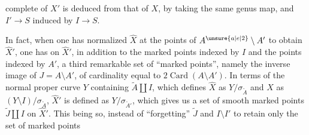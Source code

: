 complete of $X'$ is deduced from that of $X$, by taking the same genus map, and $I'\longrightarrow S$ induced by $I\longrightarrow S$.

In fact, when one has normalized $\widehat X$ at the points of $A^{\unsure{a|e|2}}\setminus A'$ to obtain $\widehat X'$, one has on $\widehat X'$, in addition to the marked points indexed by $I$ and the  points indexed by $A'$, a third remarkable set of ``marked points'', namely the inverse image  of $J=A\setminus A'$,  of cardinality equal to $2\operatorname{Card}(A\setminus A')$. In terms of the normal proper curve $Y$  containing $\widetilde A\amalg I$, which defines $\widehat X$ as $Y/\sigma_{\widetilde A}$ and $X$ as $(Y\setminus I)/\sigma_{\widetilde A}$, $\widehat X'$ is defined as $Y/\sigma_{\widetilde A'}$, which gives us a set of smooth marked points  $\widetilde J\amalg I$ on $\widehat X'$. This being so, instead of ``forgetting'' $\widetilde J$ and $I\setminus I'$ to retain only the set of marked points
